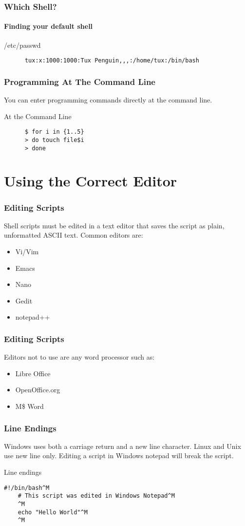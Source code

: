 \documentclass[12pt,handout,aspectratio=169]{beamer}
\begin{document}
\begin{frame}[fragile]
  \frametitle{Which Shell?}
  \framesubtitle{Finding your default shell}
  \begin{block}{/etc/passwd}
    \begin{verbatim}
      tux:x:1000:1000:Tux Penguin,,,:/home/tux:/bin/bash
    \end{verbatim}
  \end{block}
\end{frame}
\begin{frame}[fragile]
  \frametitle{Programming At The Command Line}
  You can enter programming commands directly at the command line.
   \begin{block}{At the Command Line}
    \begin{verbatim}
      $ for i in {1..5}
      > do touch file$i
      > done
    \end{verbatim}
   \end{block}
\end{frame}

\section{Using the Correct Editor}

\begin{frame}
  \frametitle{Editing Scripts}
  Shell scripts must be edited in a text editor that saves the script as plain, unformatted ASCII text. Common editors are:
  \begin{itemize}
  \item Vi/Vim
  \item Emacs
  \item Nano
  \item Gedit
  \item notepad++
  \end{itemize}
\end{frame}
\begin{frame}
  \frametitle{Editing Scripts}
  Editors not to use are any word processor such as:
  \begin{itemize}
  \item Libre Office
  \item OpenOffice.org
  \item M\$ Word
  \end{itemize}
\end{frame}
\begin{frame}[fragile]
  \frametitle{Line Endings}
  Windows uses both a carriage return and a new line character.  Linux and Unix use new line only.  Editing a script in Windows notepad will break the script.
  \begin{block}{Line endings}
\begin{verbatim}
#!/bin/bash^M
    # This script was edited in Windows Notepad^M
    ^M
    echo "Hello World"^M
    ^M
\end{verbatim}
  \end{block}
\end{frame}
\end{document}
